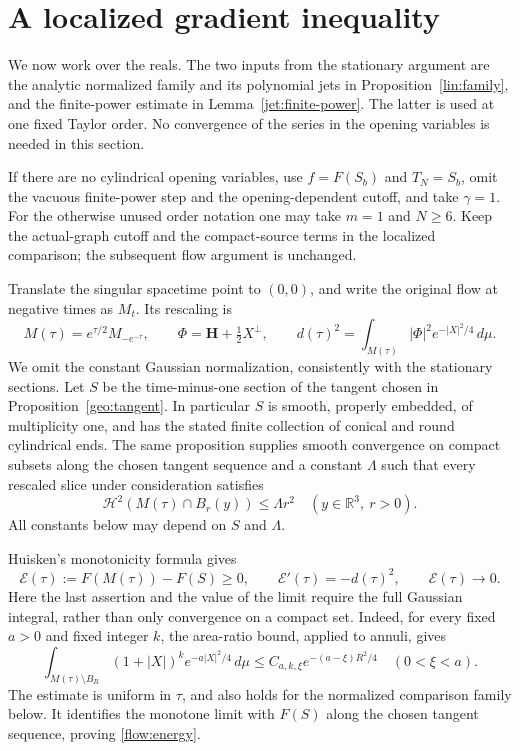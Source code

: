 \section{A localized gradient inequality}\label{sec:localized}

We now work over the reals.  The two inputs from the stationary argument
are the analytic normalized family and its polynomial jets in
Proposition~\ref{lin:family}, and the finite-power estimate in
Lemma~\ref{jet:finite-power}.  The latter is used at one fixed Taylor
order.  No convergence of the series in the opening variables is needed
in this section.

If there are no cylindrical opening variables, use $f=F(S_b)$ and
$T_N=S_b$, omit the vacuous finite-power step and the opening-dependent
cutoff, and take $\gamma=1$.  For the otherwise unused order notation
one may take $m=1$ and $N\ge6$.  Keep the actual-graph cutoff and
the compact-source terms in the localized comparison; the subsequent
flow argument is unchanged.

Translate the singular spacetime point to $(0,0)$, and write the original
flow at negative times as $M_t$.  Its rescaling is
\begin{equation}\label{flow:rescaling}
 M(\tau)=e^{\tau/2}M_{-e^{-\tau}},\qquad
 \Phi=\mathbf H+\tfrac12 X^\perp,\qquad
 d(\tau)^2=\int_{M(\tau)}|\Phi|^2e^{-|X|^2/4}\,d\mu .
\end{equation}
We omit the constant Gaussian normalization, consistently with the
stationary sections.  Let $S$ be the time-minus-one section of the
tangent chosen in Proposition~\ref{geo:tangent}.  In particular $S$ is
smooth, properly embedded, of multiplicity one, and has the stated
finite collection of conical and round cylindrical ends.  The same
proposition supplies smooth convergence on compact subsets along the
chosen tangent sequence and a constant $\Lambda$ such that every
rescaled slice under consideration satisfies
\begin{equation}\label{flow:area-ratios}
 \mathcal H^2(M(\tau)\cap B_r(y))\le \Lambda r^2
 \quad(y\in\mathbb R^3,\ r>0).
\end{equation}
All constants below may depend on $S$ and $\Lambda$.

Huisken's monotonicity formula \cite{Huisken1990} gives
\begin{equation}\label{flow:energy}
 \mathcal E(\tau):=F(M(\tau))-F(S)\ge0,\qquad
 \mathcal E'(\tau)=-d(\tau)^2,\qquad \mathcal E(\tau)\longrightarrow0.
\end{equation}
Here the last assertion and the value of the limit require the full
Gaussian integral, rather than only convergence on a compact set.
Indeed, for every fixed $a>0$ and fixed integer $k$, the area-ratio
bound, applied to annuli, gives
\begin{equation}\label{flow:gaussian-tail}
 \int_{M(\tau)\setminus B_R}(1+|X|)^k e^{-a|X|^2/4}\,d\mu
 \le C_{a,k,\xi}e^{-(a-\xi)R^2/4}\quad(0<\xi<a).
\end{equation}
The estimate is uniform in $\tau$, and also holds for the normalized
comparison family below.  It identifies the monotone limit with
$F(S)$ along the chosen tangent sequence, proving \eqref{flow:energy}.

